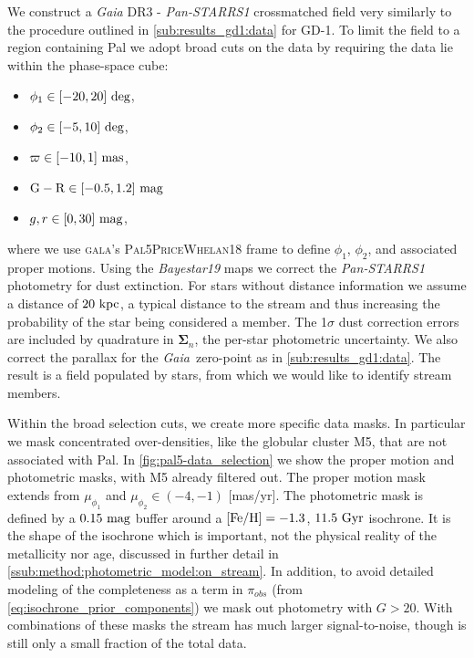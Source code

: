 \documentclass[twocolumn]{aastex631}
\newcommand{\code}[1]{\textsc{#1}}
\newcommand{\package}[1]{\code{#1}}
\newcommand{\stream}[1]{#1}
\newcommand{\dataarchive}[1]{\textit{#1}}
\newcommand{\Gaia}{\dataarchive{Gaia}}
\newcommand{\PanStarrs}{\dataarchive{Pan-STARRS1}}
\newcommand{\mbs}[1]{\boldsymbol{#1}}
\newcommand{\mcal}[1]{\mathcal{#1}}
\newcommand{\prior}{\mcal{\pi}}
\newcommand{\parallax}{\varpi}
\begin{document}
        We construct a \Gaia{} DR3 - \PanStarrs{} crossmatched field very
        similarly to the procedure outlined in \autoref{sub:results_gd1:data}
        for \stream{GD-1}.  To limit the field to a region containing
        \stream{Pal} we adopt broad cuts on the data by requiring the data
        lie within the phase-space cube:
        \begin{itemize}
            \setlength\itemsep{0em}
            \item $\phi_1 \in [-20, 20] \ \rm{deg}$,
            \item $\phi_2 \in [-5, 10] \ \rm{deg}$,
            \item $\parallax \in [-10, 1] \ \rm{mas}$,
            \item $\rm{G-R} \in [-0.5, 1.2] \ \rm{mag}$
            \item $g, r \in [0, 30] \ \rm{mag}$,
        \end{itemize}
        where we use \package{gala}'s \code{Pal5PriceWhelan18} frame
        \citep{Price-Whelan+2019} to define $\phi_1$, $\phi_2$, and associated
        proper motions.  Using the \textit{Bayestar19} maps we correct the
        \PanStarrs{} photometry for dust extinction.  For stars without distance
        information we assume a distance of $20 \ \rm{kpc}$, a typical distance
        to the stream \citep{Harris1996, Odenkirchen2003, Grillmair2006,
        Ibata+2016, Price-Whelan+2019} and thus increasing the probability of
        the star being considered a member.  The 1$\sigma$ dust correction
        errors are included by quadrature in $\mbs{\Sigma}_n$, the per-star
        photometric uncertainty. We also correct the parallax for the \Gaia\
        zero-point as in \autoref{sub:results_gd1:data}.  The result is a field
        populated by \variable{output/pal5/ndata_variable.txt} stars, from which
        we would like to identify stream members.

        Within the broad selection cuts, we create more specific data masks.  In
        particular we mask concentrated over-densities, like the globular
        cluster \stream{M5}, that are not associated with \stream{Pal\;5}.  In
        \autoref{fig:pal5-data_selection} we show the proper motion and
        photometric masks, with \stream{M5} already filtered out.  The proper
        motion mask extends from $\mu_{\phi_1}$ and $\mu_{\phi_2} \in (-4, -1)$
        [mas/yr].  The photometric mask is defined by a $0.15 \ \rm{mag}$ buffer
        around a $[\rm{Fe}/{H}] = -1.3$, $11.5 \ \rm{Gyr}$ isochrone. It is the
        shape of the isochrone which is important, not the physical reality of
        the metallicity nor age, discussed in further detail in
        \autoref{ssub:method:photometric_model:on_stream}.  In addition, to
        avoid detailed modeling of the completeness as a term in $\prior_{obs}$
        (from \autoref{eq:isochrone_prior_components}) we mask out photometry
        with $G > 20$.  With combinations of these masks the stream has much
        larger signal-to-noise, though is still only a small fraction of the
        total data.
\end{document}
